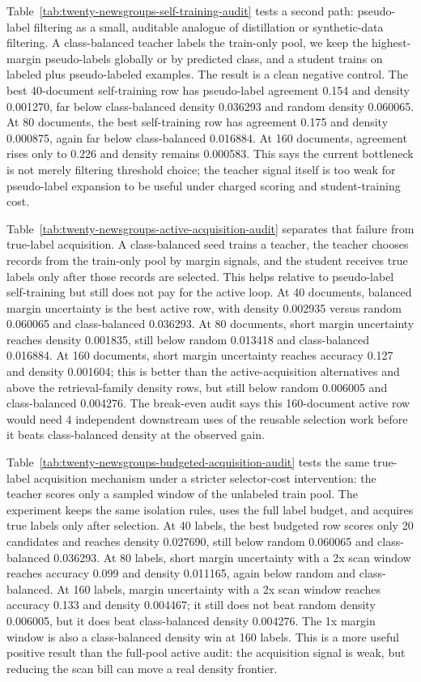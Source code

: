 \documentclass[11pt]{article}
\begin{document}
Table~\ref{tab:twenty-newsgroups-self-training-audit} tests a second path:
pseudo-label filtering as a small, auditable analogue of distillation or
synthetic-data filtering. A class-balanced teacher labels the train-only pool,
we keep the highest-margin pseudo-labels globally or by predicted class, and a
student trains on labeled plus pseudo-labeled examples. The result is a clean
negative control. The best 40-document self-training row has pseudo-label
agreement 0.154 and density 0.001270, far below class-balanced density 0.036293
and random density 0.060065. At 80 documents, the best self-training row has
agreement 0.175 and density 0.000875, again far below class-balanced 0.016884.
At 160 documents, agreement rises only to 0.226 and density remains 0.000583.
This says the current bottleneck is not merely filtering threshold choice; the
teacher signal itself is too weak for pseudo-label expansion to be useful under
charged scoring and student-training cost.

Table~\ref{tab:twenty-newsgroups-active-acquisition-audit} separates that
failure from true-label acquisition. A class-balanced seed trains a teacher,
the teacher chooses records from the train-only pool by margin signals, and the
student receives true labels only after those records are selected. This helps
relative to pseudo-label self-training but still does not pay for the active
loop. At 40 documents, balanced margin uncertainty is the best active row, with
density 0.002935 versus random 0.060065 and class-balanced 0.036293. At 80
documents, short margin uncertainty reaches density 0.001835, still below
random 0.013418 and class-balanced 0.016884. At 160 documents, short margin
uncertainty reaches accuracy 0.127 and density 0.001604; this is better than
the active-acquisition alternatives and above the retrieval-family density
rows, but still below random 0.006005 and class-balanced 0.004276. The
break-even audit says this 160-document active row would need 4 independent
downstream uses of the reusable selection work before it beats class-balanced
density at the observed gain.

Table~\ref{tab:twenty-newsgroups-budgeted-acquisition-audit} tests the same
true-label acquisition mechanism under a stricter selector-cost intervention:
the teacher scores only a sampled window of the unlabeled train pool. The
experiment keeps the same isolation rules, uses the full label budget, and
acquires true labels only after selection. At 40 labels, the best budgeted row
scores only 20 candidates and reaches density 0.027690, still below random
0.060065 and class-balanced 0.036293. At 80 labels, short margin uncertainty
with a 2x scan window reaches accuracy 0.099 and density 0.011165, again below
random and class-balanced. At 160 labels, margin uncertainty with a 2x scan
window reaches accuracy 0.133 and density 0.004467; it still does not beat
random density 0.006005, but it does beat class-balanced density 0.004276. The
1x margin window is also a class-balanced density win at 160 labels. This is a
more useful positive result than the full-pool active audit: the acquisition
signal is weak, but reducing the scan bill can move a real density frontier.
\end{document}
